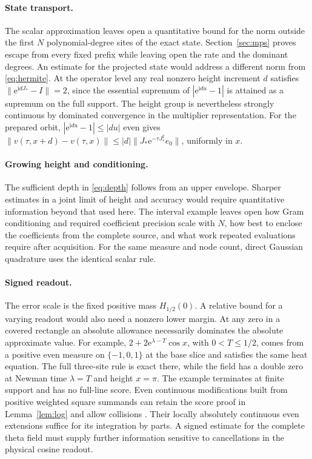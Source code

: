 \documentclass[11pt]{article}
\numberwithin{equation}{section}
\newcommand{\ee}{\mathrm e}
\newcommand{\ii}{\mathrm i}
\begin{document}
\paragraph{State transport.}
The scalar approximation leaves open a quantitative bound for
the norm outside the first \(N\) polynomial-degree sites of the
exact state. Section~\ref{sec:mps} proves escape from every fixed
prefix while leaving open the rate and the dominant degrees.
An estimate for the projected state would address a different
norm from \eqref{eq:hermite}. At the operator level any real
nonzero height increment \(d\) satisfies
\(\|\ee^{\ii dJ_*}-I\|=2\), since the essential supremum of
\(|\ee^{\ii du}-1|\) is attained as a supremum on the full
support. The height group is nevertheless strongly continuous
by dominated convergence in the multiplier representation.
For the prepared orbit, \(|\ee^{\ii du}-1|\le|du|\) even gives
\(\|v(\tau,x+d)-v(\tau,x)\|\le|d|\|J_*\ee^{-\tau J_*^2}e_0\|\),
uniformly in \(x\).

\paragraph{Growing height and conditioning.}
The sufficient depth in \eqref{eq:depth} follows from an upper
envelope. Sharper estimates in a joint limit of height and
accuracy would require quantitative information beyond that
used here. The interval example leaves open how Gram conditioning
and required coefficient precision scale with \(N\), how best
to enclose the coefficients from the complete source, and what
work repeated evaluations require after acquisition. For the
same measure and node count, direct Gaussian quadrature uses
the identical scalar rule.

\paragraph{Signed readout.}
The error scale is the fixed positive mass \(H_{1/2}(0)\).
A relative bound for a varying readout would also need a
nonzero lower margin. At any zero in a covered rectangle an
absolute allowance necessarily dominates the absolute approximate
value. For example, \(2+2\ee^{\lambda-T}\cos x\), with
\(0<T\le1/2\), comes from a positive even measure on
\(\{-1,0,1\}\) at the base slice and satisfies the same heat
equation. The full three-site rule is exact there, while the
field has a double zero at Newman time \(\lambda=T\) and
height \(x=\pi\). The example terminates
at finite support and has no full-line score. Even continuous
modifications built from positive weighted square summands can
retain the score proof in Lemma~\ref{lem:log} and allow
collisions \cite{controls}. Their locally absolutely continuous
even extensions suffice for its integration by parts. A signed
estimate for the complete theta field must supply further
information sensitive to cancellations in the physical cosine
readout.
\end{document}
